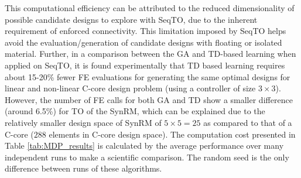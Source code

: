 This computational efficiency can be attributed to the reduced dimensionality of possible candidate designs to explore with SeqTO, due to the inherent requirement of enforced connectivity. This limitation imposed by SeqTO helps avoid the evaluation/generation of candidate designs with floating or isolated material. Further, in a comparison between the GA and TD-based learning when applied on SeqTO, it is found experimentally that TD based learning requires about 15-20\% fewer FE evaluations for generating the same optimal designs for linear and non-linear C-core design problem (using a controller of size  $3 \times 3$). However, the number of FE calls for both GA and TD show a smaller difference (around 6.5\%) for TO of the SynRM, which can be explained due to the relatively smaller design space of SynRM of $5 \times 5 = 25$ as compared to that of a C-core ($288$ elements in C-core design space). The computation cost presented in Table \ref{tab:MDP_results} is calculated by the average performance over many independent runs to make a scientific comparison. The random seed is the only difference between runs of these algorithms. 

